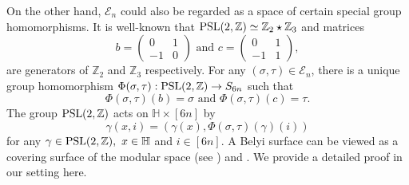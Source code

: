 \documentclass{amsart}
\theoremstyle{plain}
\theoremstyle{definition}
\theoremstyle{remark}
\begin{document}
 On the other hand, $\mathcal{E}_n$ could also be regarded as a space of certain special group homomorphisms. It is well-known that $\textnormal{PSL}(2,\mathbb{Z})\simeq\mathbb{Z}_2\star\mathbb{Z}_3$ and matrices
$$b=\begin{pmatrix}
  0 & 1\\ -1 & 0
\end{pmatrix}\text{ and }c=\begin{pmatrix}
0 & 1\\ -1 & 1
\end{pmatrix},$$
are generators of $\mathbb{Z}_2$ and $\mathbb{Z}_3$ respectively. For any $(\sigma,\tau)\in\mathcal{E}_n$, there is a unique group homomorphism $\Phi(\sigma,\tau):\textnormal{PSL}(2,\mathbb{Z})\to S_{6n}$ such that
$$\Phi(\sigma,\tau)(b)=\sigma\text{ and }\Phi(\sigma,\tau)(c)=\tau.$$
The group $\textnormal{PSL}(2,\mathbb{Z})$ acts on $\mathbb{H}\times [6n]$ by 
$$\gamma(x,i)=(\gamma(x),\Phi(\sigma,\tau)(\gamma)(i))$$
 for any $\gamma\in\textnormal{PSL}(2,\mathbb{Z}),\ x\in\mathbb{H}$ and $i\in [6n]$. A Belyi surface can be viewed as a covering surface of the modular space (see \cite[Section 1]{BM01}) and \cite[Subsection 2.6]{LP25}. We provide a detailed proof in our setting here.
\end{document}

